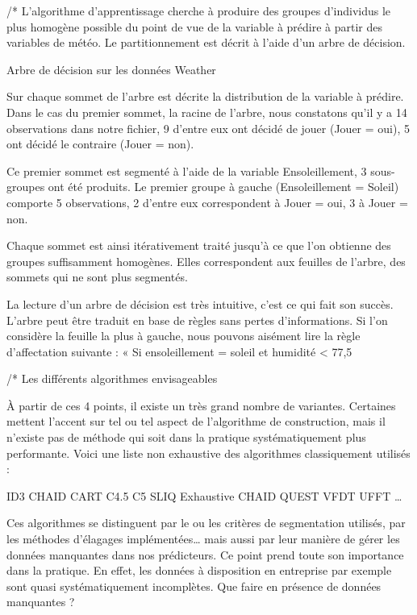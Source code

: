 /*
L’algorithme d’apprentissage cherche à produire des groupes d’individus le plus homogène possible du point de vue de la variable à prédire à partir des variables de météo. Le partitionnement est décrit à l’aide d’un arbre de décision.

Arbre de décision sur les données Weather

Sur chaque sommet de l’arbre est décrite la distribution de la variable à prédire. Dans le cas du premier sommet, la racine de l’arbre, nous constatons qu’il y a 14 observations dans notre fichier, 9 d’entre eux ont décidé de jouer (Jouer = oui), 5 ont décidé le contraire (Jouer = non).

Ce premier sommet est segmenté à l’aide de la variable Ensoleillement, 3 sous-groupes ont été produits. Le premier groupe à gauche (Ensoleillement = Soleil) comporte 5 observations, 2 d’entre eux correspondent à Jouer = oui, 3 à Jouer = non.

Chaque sommet est ainsi itérativement traité jusqu’à ce que l’on obtienne des groupes suffisamment homogènes. Elles correspondent aux feuilles de l’arbre, des sommets qui ne sont plus segmentés.

La lecture d’un arbre de décision est très intuitive, c’est ce qui fait son succès. L’arbre peut être traduit en base de règles sans pertes d’informations. Si l’on considère la feuille la plus à gauche, nous pouvons aisément lire la règle d’affectation suivante : « Si ensoleillement = soleil et humidité < 77,5 %



/*
 Les différents algorithmes envisageables

À partir de ces 4 points, il existe un très grand nombre de variantes. Certaines mettent l’accent sur tel ou tel aspect de l’algorithme de construction, mais il n’existe pas de méthode qui soit dans la pratique systématiquement plus performante. Voici une liste non exhaustive des algorithmes classiquement utilisés :

    ID3
    CHAID
    CART
    C4.5
    C5
    SLIQ
    Exhaustive CHAID
    QUEST
    VFDT
    UFFT
    …

Ces algorithmes se distinguent par le ou les critères de segmentation utilisés, par les méthodes d'élagages implémentées… mais aussi par leur manière de gérer les données manquantes dans nos prédicteurs. Ce point prend toute son importance dans la pratique. En effet, les données à disposition en entreprise par exemple sont quasi systématiquement incomplètes. Que faire en présence de données manquantes ?

